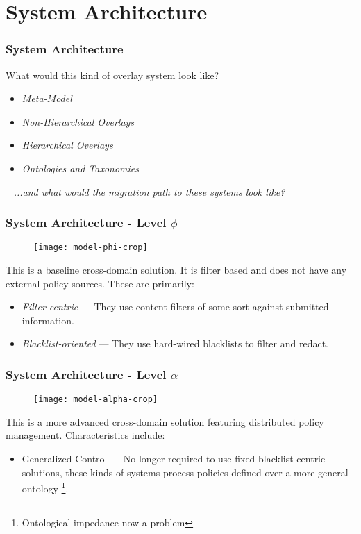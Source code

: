 \section{System Architecture}
\begin{frame}
\frametitle{System Architecture}
What would this kind of overlay system look like?
\pause
\begin{itemize}
\item \textit{Meta-Model}
\pause
\item \textit{Non-Hierarchical Overlays}
\pause
\item \textit{Hierarchical Overlays}
\pause
\item \textit{Ontologies and Taxonomies}
\end{itemize}
\
\newline
\newline
\pause
\textit{...and what would the migration path to these systems look like?}
\end{frame}

\begin{frame}[t]
\frametitle{System Architecture - Level $\phi$}
\begin{figure}[!t]
\centering
\texttt{[image: model-phi-crop]}
\label{fig:model:phi}
\end{figure}
This is a baseline cross-domain solution.  It is filter based and does not have any external  policy sources.  These are primarily:
\pause
\newline
\begin{itemize}
\item \textit{Filter-centric} --- They use content filters of some sort against submitted information.
\pause
\item \textit{Blacklist-oriented} --- They use hard-wired blacklists to filter and redact.
\end{itemize}
\end{frame}

\begin{frame}[t]
\frametitle{System Architecture - Level $\alpha$}
\begin{figure}[!t]
\centering
\texttt{[image: model-alpha-crop]}
\label{fig:model:alpha}
\end{figure}
This is a more advanced cross-domain solution featuring distributed policy management.  Characteristics include:
\pause
\newline
\begin{itemize}
\item {Generalized Control} --- No longer required to use fixed blacklist-centric solutions, these kinds of systems process policies defined over a more general ontology \footnote{Ontological impedance now a problem}.
\end{itemize}
\end{frame}

